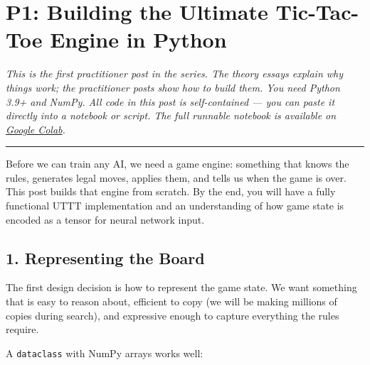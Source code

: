 \hypertarget{p1-building-the-ultimate-tic-tac-toe-engine-in-python}{%
\section{P1: Building the Ultimate Tic-Tac-Toe Engine in
Python}\label{p1-building-the-ultimate-tic-tac-toe-engine-in-python}}

\emph{This is the first practitioner post in the series. The theory
essays explain why things work; the practitioner posts show how to build
them. You need Python 3.9+ and NumPy. All code in this post is
self-contained --- you can paste it directly into a notebook or script.
The full runnable notebook is available on
\href{https://colab.research.google.com/github/thltsui/UlltimateTicTacToe/blob/Substack/substack/notebook_1_uttt_engine.ipynb}{Google
Colab}.}

\begin{center}\rule{0.5\linewidth}{0.5pt}\end{center}

Before we can train any AI, we need a game engine: something that knows
the rules, generates legal moves, applies them, and tells us when the
game is over. This post builds that engine from scratch. By the end, you
will have a fully functional UTTT implementation and an understanding of
how game state is encoded as a tensor for neural network input.

\hypertarget{representing-the-board}{%
\subsection{1. Representing the Board}\label{representing-the-board}}

The first design decision is how to represent the game state. We want
something that is easy to reason about, efficient to copy (we will be
making millions of copies during search), and expressive enough to
capture everything the rules require.

A \texttt{dataclass} with NumPy arrays works well:

